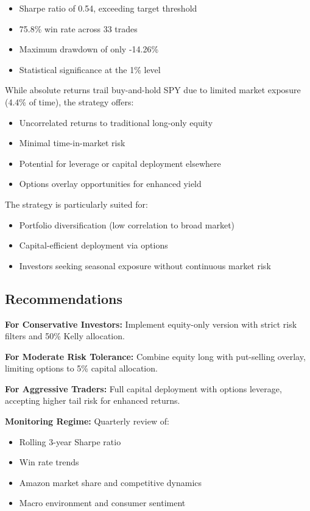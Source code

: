 \documentclass[twocolumn,ieee]{arithmaxresearch}
\begin{document}
\begin{itemize}
    \item Sharpe ratio of 0.54, exceeding target threshold
    \item 75.8\% win rate across 33 trades
    \item Maximum drawdown of only -14.26\%
    \item Statistical significance at the 1\% level
\end{itemize}

While absolute returns trail buy-and-hold SPY due to limited market exposure (4.4\% of time), the strategy offers:
\begin{itemize}
    \item Uncorrelated returns to traditional long-only equity
    \item Minimal time-in-market risk
    \item Potential for leverage or capital deployment elsewhere
    \item Options overlay opportunities for enhanced yield
\end{itemize}

The strategy is particularly suited for:
\begin{itemize}
    \item Portfolio diversification (low correlation to broad market)
    \item Capital-efficient deployment via options
    \item Investors seeking seasonal exposure without continuous market risk
\end{itemize}

\subsection{Recommendations}

\textbf{For Conservative Investors:}
Implement equity-only version with strict risk filters and 50\% Kelly allocation.

\textbf{For Moderate Risk Tolerance:}
Combine equity long with put-selling overlay, limiting options to 5\% capital allocation.

\textbf{For Aggressive Traders:}
Full capital deployment with options leverage, accepting higher tail risk for enhanced returns.

\textbf{Monitoring Regime:}
Quarterly review of:
\begin{itemize}
    \item Rolling 3-year Sharpe ratio
    \item Win rate trends
    \item Amazon market share and competitive dynamics
    \item Macro environment and consumer sentiment
\end{itemize}
\end{document}
